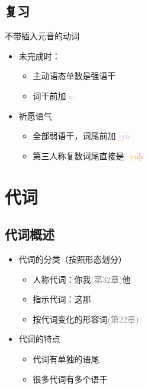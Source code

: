 \documentclass[17pt]{beamer}
\newcommand{\wordending}[1]{\textcolor{Orange}{\nobreakdash-#1}}
\newcommand{\pratyaya}[1]{\textcolor{Plum}{#1}}
\newcommand{\notsoimportant}[1]{\textcolor{gray}{#1}}
\begin{document}
\subsection{复习}
\begin{frame}{不带插入元音的动词}
  \raggedright
  \begin{itemize}
    \item 未完成时：
    \begin{itemize}
      \item 主动语态单数是强语干
      \item 词干前加 \pratyaya{a\nobreakdash-} 
    \end{itemize} 
    \item 祈愿语气
    \begin{itemize}
      \item 全部弱语干，词尾前加 \pratyaya{\nobreakdash-yā-}
      \item 第三人称复数词尾直接是 \wordending{yuḥ}
    \end{itemize}
  \end{itemize}
\end{frame}



\section{代词}
\begin{frame}{\insertsection }
    \tableofcontents[currentsection]
\end{frame}

\subsection{代词概述}
\begin{frame}{\insertsubsection}
  \begin{itemize}
    \item 代词的分类（按照形态划分）
    \begin{itemize}
      \item 人称代词：你我\notsoimportant{(第32章)}他
      \item 指示代词：这那
      \item 按代词变化的形容词\notsoimportant{(第22章)}
    \end{itemize}
    \item 代词的特点
    \begin{itemize}
      \item 代词有单独的语尾
      \item 很多代词有多个语干
    \end{itemize}
  \end{itemize}
  
\end{frame}
\end{document}
